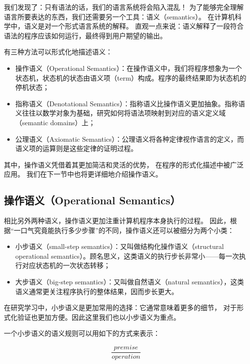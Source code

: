 \documentclass[../main.tex]{subfiles}
\begin{document}
  \indent 我们发现了：只有语法的话，我们的语言系统将会陷入混乱！
  为了能够完全理解语言所要表达的东西，我们还需要另一个工具：语义（semantics）。
  在计算机科学中，语义是对一个形式语言系统的解释。\cite{semwiki}
  直观一点来说：语义解释了一段符合语法的程序应该如何运行，最终得到用户期望的输出。

  \indent 有三种方法可以形式化地描述语义：\cite{tapl}

  \begin{itemize}
    \item 操作语义（Operational Semantics）：在操作语义中，我们将程序想象为一个状态机，状态机的状态由语义项（term）构成。程序的最终结果即为状态机的停机状态；
    \item 指称语义（Denotational Semantics）：指称语义比操作语义更加抽象。指称语义往往以数学对象为基础，研究如何将语法项映射到对应的语义定义域（semantic domains）上；
    \item 公理语义（Axiomatic Semantics）：公理语义将各种定律视作语言的定义，而语义项的运算则是这些定律的证明过程。
  \end{itemize}

  \indent 其中，操作语义凭借着其更加简洁和灵活的优势，
  在程序的形式化描述中被广泛应用。\cite{tapl}
  我们在下一节中也将更详细地介绍操作语义。

  \subsection{操作语义（Operational Semantics）}
  \indent 相比另外两种语义，操作语义更加注重计算机程序本身执行的过程。
  因此，根据“一口气究竟能执行多少步骤”的不同，操作语义还可以被细分为两个小类：\cite{opwiki}

  \begin{itemize}
    \item 小步语义（small-step semantics）：又叫做结构化操作语义（structural operational semantics）。顾名思义，这类语义的执行步长非常小——每一次执行对应状态机的一次状态转移；
    \item 大步语义（big-step semantics）：又叫做自然语义（natural semantics），这类语义通常更关注程序执行的整体结果，因而步长更大。
  \end{itemize}

  \indent 在研究学习中，小步语义是更加常用的选择：它通常意味着更多的细节，
  对于形式化验证也更加方便。因此这里我们也以小步语义为重点。

  \indent 一个小步语义的语义规则可以用如下的方式来表示：

  $$\frac{premise}{operation}$$
\end{document}

